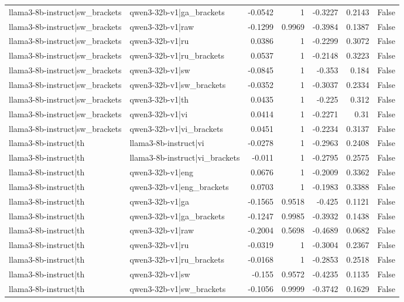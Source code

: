 \begin{table}
\begin{tabular}{l l r r r r l}
llama3-8b-instruct|sw_brackets & qwen3-32b-v1|ga_brackets & -0.0542 & 1 & -0.3227 & 0.2143 & False \\
llama3-8b-instruct|sw_brackets & qwen3-32b-v1|raw & -0.1299 & 0.9969 & -0.3984 & 0.1387 & False \\
llama3-8b-instruct|sw_brackets & qwen3-32b-v1|ru & 0.0386 & 1 & -0.2299 & 0.3072 & False \\
llama3-8b-instruct|sw_brackets & qwen3-32b-v1|ru_brackets & 0.0537 & 1 & -0.2148 & 0.3223 & False \\
llama3-8b-instruct|sw_brackets & qwen3-32b-v1|sw & -0.0845 & 1 & -0.353 & 0.184 & False \\
llama3-8b-instruct|sw_brackets & qwen3-32b-v1|sw_brackets & -0.0352 & 1 & -0.3037 & 0.2334 & False \\
llama3-8b-instruct|sw_brackets & qwen3-32b-v1|th & 0.0435 & 1 & -0.225 & 0.312 & False \\
llama3-8b-instruct|sw_brackets & qwen3-32b-v1|vi & 0.0414 & 1 & -0.2271 & 0.31 & False \\
llama3-8b-instruct|sw_brackets & qwen3-32b-v1|vi_brackets & 0.0451 & 1 & -0.2234 & 0.3137 & False \\
llama3-8b-instruct|th & llama3-8b-instruct|vi & -0.0278 & 1 & -0.2963 & 0.2408 & False \\
llama3-8b-instruct|th & llama3-8b-instruct|vi_brackets & -0.011 & 1 & -0.2795 & 0.2575 & False \\
llama3-8b-instruct|th & qwen3-32b-v1|eng & 0.0676 & 1 & -0.2009 & 0.3362 & False \\
llama3-8b-instruct|th & qwen3-32b-v1|eng_brackets & 0.0703 & 1 & -0.1983 & 0.3388 & False \\
llama3-8b-instruct|th & qwen3-32b-v1|ga & -0.1565 & 0.9518 & -0.425 & 0.1121 & False \\
llama3-8b-instruct|th & qwen3-32b-v1|ga_brackets & -0.1247 & 0.9985 & -0.3932 & 0.1438 & False \\
llama3-8b-instruct|th & qwen3-32b-v1|raw & -0.2004 & 0.5698 & -0.4689 & 0.0682 & False \\
llama3-8b-instruct|th & qwen3-32b-v1|ru & -0.0319 & 1 & -0.3004 & 0.2367 & False \\
llama3-8b-instruct|th & qwen3-32b-v1|ru_brackets & -0.0168 & 1 & -0.2853 & 0.2518 & False \\
llama3-8b-instruct|th & qwen3-32b-v1|sw & -0.155 & 0.9572 & -0.4235 & 0.1135 & False \\
llama3-8b-instruct|th & qwen3-32b-v1|sw_brackets & -0.1056 & 0.9999 & -0.3742 & 0.1629 & False \\

\end{tabular}
\end{table}
